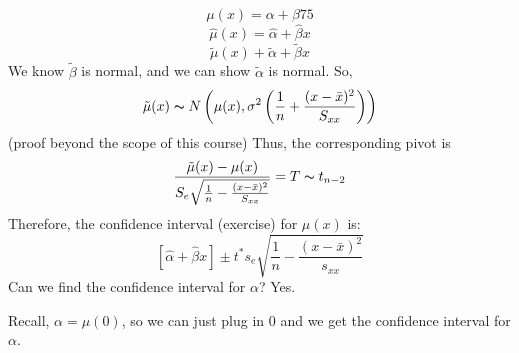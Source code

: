 \[ \mu(x)=\alpha+\beta 75 \]
\[ \hat{\mu}(x)=\hat{\alpha}+\hat{\beta}x \]
\[ \tilde{\mu}(x)+\tilde{\alpha}+\tilde{\beta}x \]
We know $ \tilde{\beta} $ is normal, and we can show $ \tilde{\alpha} $ is normal.
So,
\[ \tilde{\mu}(x) \thicksim N \left( \mu(x),\sigma^2
    \left( \frac{1}{n} +\frac{(x-\bar{x})^2}{S_{xx}} \right) \right) \]
(proof beyond the scope of this course)
Thus, the corresponding pivot is
\[ \frac{\tilde{\mu}(x)-\mu(x)}{S_{e}\sqrt{\frac{1}{n}-\frac{(x-\bar{x})^2}{S_{xx}}}}
    = T \thicksim t_{n-2} \]
Therefore, the confidence interval (exercise) for $ \mu(x) $ is:
\[ \left[ \hat{\alpha}+\hat{\beta}x \right]
    \pm
    t^* s_e \sqrt{\frac{1}{n}-\frac{(x-\bar{x})^2}{s_{xx}}} \]
Can we find the confidence interval for $ \alpha $? Yes.

Recall, $ \alpha=\mu(0) $, so we can just plug in $ 0 $ and we get the confidence
interval for $ \alpha $.
